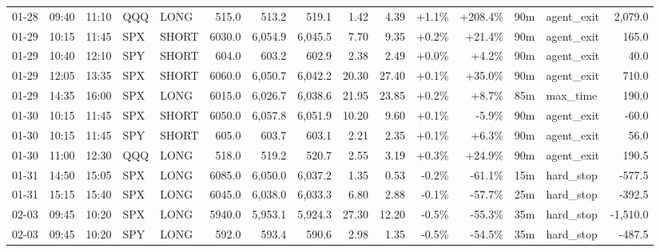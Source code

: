 \documentclass[11pt,a4paper,twoside]{article}
\begin{document}
\begin{landscape}
\begin{center}
\begin{longtable}{>{\color{txtmain}}l l l l l r r r r r r r r >{\color{txtmain}}l r}
01-28 & 09:40 & 11:10 & QQQ & LONG & 515.0 & 513.2 & 519.1 & 1.42 & 4.39 & \textcolor{wingreen}{+1.1\%} & \textcolor{wingreen}{+208.4\%} & 90m & agent\_exit & \textcolor{wingreen}{2,079.0} \\
01-29 & 10:15 & 11:45 & SPX & SHORT & 6030.0 & 6,054.9 & 6,045.5 & 7.70 & 9.35 & \textcolor{wingreen}{+0.2\%} & \textcolor{wingreen}{+21.4\%} & 90m & agent\_exit & \textcolor{wingreen}{165.0} \\
01-29 & 10:40 & 12:10 & SPY & SHORT & 604.0 & 603.2 & 602.9 & 2.38 & 2.49 & \textcolor{wingreen}{+0.0\%} & \textcolor{wingreen}{+4.2\%} & 90m & agent\_exit & \textcolor{wingreen}{40.0} \\
01-29 & 12:05 & 13:35 & SPX & SHORT & 6060.0 & 6,050.7 & 6,042.2 & 20.30 & 27.40 & \textcolor{wingreen}{+0.1\%} & \textcolor{wingreen}{+35.0\%} & 90m & agent\_exit & \textcolor{wingreen}{710.0} \\
01-29 & 14:35 & 16:00 & SPX & LONG & 6015.0 & 6,026.7 & 6,038.6 & 21.95 & 23.85 & \textcolor{wingreen}{+0.2\%} & \textcolor{wingreen}{+8.7\%} & 85m & max\_time & \textcolor{wingreen}{190.0} \\
01-30 & 10:15 & 11:45 & SPX & SHORT & 6050.0 & 6,057.8 & 6,051.9 & 10.20 & 9.60 & \textcolor{wingreen}{+0.1\%} & \textcolor{lossred}{-5.9\%} & 90m & agent\_exit & \textcolor{lossred}{-60.0} \\
01-30 & 10:15 & 11:45 & SPY & SHORT & 605.0 & 603.7 & 603.1 & 2.21 & 2.35 & \textcolor{wingreen}{+0.1\%} & \textcolor{wingreen}{+6.3\%} & 90m & agent\_exit & \textcolor{wingreen}{56.0} \\
01-30 & 11:00 & 12:30 & QQQ & LONG & 518.0 & 519.2 & 520.7 & 2.55 & 3.19 & \textcolor{wingreen}{+0.3\%} & \textcolor{wingreen}{+24.9\%} & 90m & agent\_exit & \textcolor{wingreen}{190.5} \\
01-31 & 14:50 & 15:05 & SPX & LONG & 6085.0 & 6,050.0 & 6,037.2 & 1.35 & 0.53 & \textcolor{lossred}{-0.2\%} & \textcolor{lossred}{-61.1\%} & 15m & hard\_stop & \textcolor{lossred}{-577.5} \\
01-31 & 15:15 & 15:40 & SPX & LONG & 6045.0 & 6,038.0 & 6,033.3 & 6.80 & 2.88 & \textcolor{lossred}{-0.1\%} & \textcolor{lossred}{-57.7\%} & 25m & hard\_stop & \textcolor{lossred}{-392.5} \\
02-03 & 09:45 & 10:20 & SPX & LONG & 5940.0 & 5,953.1 & 5,924.3 & 27.30 & 12.20 & \textcolor{lossred}{-0.5\%} & \textcolor{lossred}{-55.3\%} & 35m & hard\_stop & \textcolor{lossred}{-1,510.0} \\
02-03 & 09:45 & 10:20 & SPY & LONG & 592.0 & 593.4 & 590.6 & 2.98 & 1.35 & \textcolor{lossred}{-0.5\%} & \textcolor{lossred}{-54.5\%} & 35m & hard\_stop & \textcolor{lossred}{-487.5} \\

\end{longtable}
\end{center}
\end{landscape}
\end{document}
